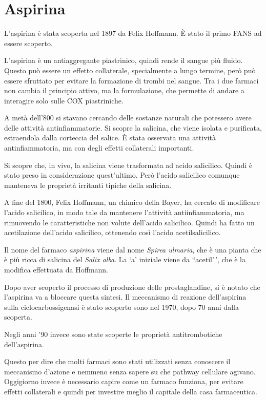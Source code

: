 \section{Aspirina}

L'aspirina è stata scoperta nel 1897 da Felix Hoffmann. È stato il primo
FANS ad essere scoperto.

L'aspirina è un antiaggregante piastrinico, quindi rende il sangue più
fluido. Questo può essere un effetto collaterale, specialmente a lungo
termine, però può essere sfruttato per evitare la formazione di
trombi nel
sangue. Tra i due farmaci non cambia il principio attivo, ma la
formulazione, che permette di andare a interagire solo sulle COX
piastriniche.

A metà dell'800 si stavano cercando delle sostanze naturali che
potessero avere delle attività antinfiammatorie. Si scopre la salicina,
che viene isolata e purificata, estraendola dalla corteccia del salice.
È stata osservata una attività antinfiammatoria, ma con degli effetti
collaterali importanti.

Si scopre che, in vivo, la salicina viene trasformata ad acido
salicilico. Quindi è stato preso in considerazione quest'ultimo. Però
l'acido salicilico comunque manteneva le proprietà irritanti tipiche
della salicina.

A fine del 1800, Felix Hoffmann, un chimico della Bayer, ha cercato di
modificare l'acido salicilico, in modo tale da mantenere l'attività
antiinfiammatoria, ma rimuovendo le caratteristiche non volute
dell'acido salicilico. Quindi ha fatto un acetilazione dell'acido
salicilico, ottenendo così l'acido acetilsalicilico.

Il nome del farmaco \emph{aspirina} viene dal nome \emph{Spirea
ulmaria}, che è una pianta che è più ricca di salicina del \emph{Salix
alba}. La `a' iniziale viene da ``acetil'\,', che è la modifica
effettuata da Hoffmann.

Dopo aver scoperto il processo di produzione delle prostaglandine, si è
notato che l'aspirina va a bloccare questa sintesi. Il meccanismo di
reazione dell'aspirina sulla ciclocarbossigenasi è stato scoperto sono
nel 1970, dopo 70 anni dalla scoperta.

Negli anni '90 invece sono state scoperte le proprietà antitrombotiche
dell'aspirina.

Questo per dire che molti farmaci sono stati utilizzati senza conoscere
il meccanismo d'azione e nemmeno senza sapere su che pathway cellulare
agivano. Oggigiorno invece è necessario capire come un farmaco funziona,
per evitare effetti collaterali e quindi per investire meglio il
capitale della casa farmaceutica.

